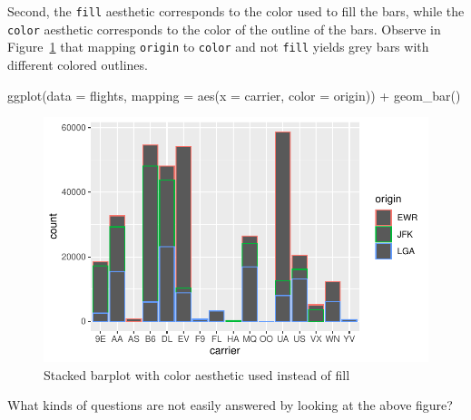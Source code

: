 \documentclass[
  letterpaper,
  DIV=11,
  numbers=noendperiod]{scrreprt}
\newenvironment{Shaded}{\begin{snugshade}}{\end{snugshade}}
\newcommand{\AttributeTok}[1]{\textcolor[rgb]{0.40,0.45,0.13}{#1}}
\newcommand{\FunctionTok}[1]{\textcolor[rgb]{0.28,0.35,0.67}{#1}}
\newcommand{\NormalTok}[1]{\textcolor[rgb]{0.00,0.23,0.31}{#1}}
\newcommand{\SpecialCharTok}[1]{\textcolor[rgb]{0.37,0.37,0.37}{#1}}
\theoremstyle{definition}
\theoremstyle{remark}
\begin{document}
Second, the \texttt{fill} aesthetic corresponds to the color used to
fill the bars, while the \texttt{color} aesthetic corresponds to the
color of the outline of the bars. Observe in
Figure~\ref{fig-flights-stacked-bar-color} that mapping \texttt{origin}
to \texttt{color} and not \texttt{fill} yields grey bars with different
colored outlines.

\begin{Shaded}
\begin{Highlighting}[]
\FunctionTok{ggplot}\NormalTok{(}\AttributeTok{data =}\NormalTok{ flights, }\AttributeTok{mapping =} \FunctionTok{aes}\NormalTok{(}\AttributeTok{x =}\NormalTok{ carrier, }\AttributeTok{color =}\NormalTok{ origin)) }\SpecialCharTok{+}
  \FunctionTok{geom\_bar}\NormalTok{()}
\end{Highlighting}
\end{Shaded}

\begin{figure}[H]

{\centering \includegraphics{02-visualization_files/figure-pdf/fig-flights-stacked-bar-color-1.pdf}

}

\caption{\label{fig-flights-stacked-bar-color}Stacked barplot with color
aesthetic used instead of fill}

\end{figure}

\begin{tcolorbox}[enhanced jigsaw, coltitle=black, toprule=.15mm, bottomtitle=1mm, breakable, leftrule=.75mm, title={{🎯} Learning Check 2.32}, opacitybacktitle=0.6, colback=white, rightrule=.15mm, opacityback=0, toptitle=1mm, colbacktitle=quarto-callout-tip-color!10!white, colframe=quarto-callout-tip-color-frame, titlerule=0mm, arc=.35mm, bottomrule=.15mm, left=2mm]
What kinds of questions are not easily answered by looking at the above
figure?
\end{tcolorbox}
\end{document}
